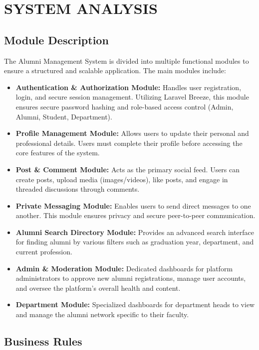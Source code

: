 \chapter{SYSTEM ANALYSIS }
 
\section{Module Description}
The Alumni Management System is divided into multiple functional modules to ensure a structured and scalable application. The main modules include:
\begin{itemize}
    \item \textbf{Authentication \& Authorization Module:} Handles user registration, login, and secure session management. Utilizing Laravel Breeze, this module ensures secure password hashing and role-based access control (Admin, Alumni, Student, Department).
    \item \textbf{Profile Management Module:} Allows users to update their personal and professional details. Users must complete their profile before accessing the core features of the system.
    \item \textbf{Post \& Comment Module:} Acts as the primary social feed. Users can create posts, upload media (images/videos), like posts, and engage in threaded discussions through comments.
    \item \textbf{Private Messaging Module:} Enables users to send direct messages to one another. This module ensures privacy and secure peer-to-peer communication.
    \item \textbf{Alumni Search Directory Module:} Provides an advanced search interface for finding alumni by various filters such as graduation year, department, and current profession.
    \item \textbf{Admin & Moderation Module:} Dedicated dashboards for platform administrators to approve new alumni registrations, manage user accounts, and oversee the platform's overall health and content.
    \item \textbf{Department Module:} Specialized dashboards for department heads to view and manage the alumni network specific to their faculty.
\end{itemize}

\section{Business Rules}


